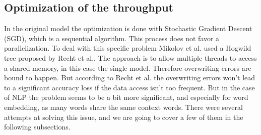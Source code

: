 {\subsection{Optimization of the throughput}
In the original model the optimization is done with Stochastic Gradient Descent (SGD), which is a sequential algorithm. This process does not favor a parallelization. To deal with this specific problem Mikolov et al.\cite{mikolov2} used a Hogwild tree proposed by Recht et al.\cite{hogwild}. The approach is to allow multiple threads to access a shared memory, in this case the single model. Therefore overwriting errors are bound to happen. But according to Recht et al.\cite{hogwild} the overwriting errors won't lead to a significant accuracy loss if the data access isn't too frequent. But in the case of NLP the problem seems to be a bit more significant, and especially for word embedding, as many words share the same context words. There were several attempts at solving this issue, and we are going to cover a few of them in the following subsections. 

}
